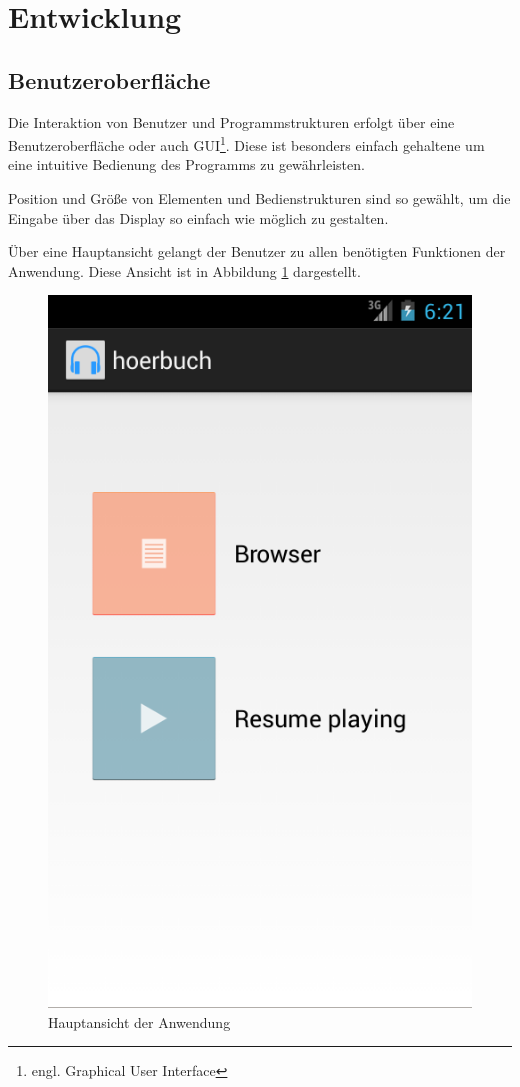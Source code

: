 \section{Entwicklung}
\subsection{Benutzeroberfläche}
Die Interaktion von Benutzer und Programmstrukturen erfolgt über eine Benutzeroberfläche oder auch GUI\footnote{engl. Graphical User Interface}. Diese ist besonders einfach gehaltene um eine intuitive Bedienung des Programms zu gewährleisten.

Position und Größe von Elementen und Bedienstrukturen sind so gewählt, um die Eingabe über das Display so einfach wie möglich zu gestalten. 

Über eine Hauptansicht gelangt der Benutzer zu allen benötigten Funktionen der Anwendung. Diese Ansicht ist in Abbildung \ref{mainscreen} dargestellt.

\begin{figure}[ht!]
\begin{center}
\includegraphics[scale=.5]{images/mainscreen}
\caption{Hauptansicht der Anwendung}
\label{mainscreen}
\end{center}
\end{figure}

